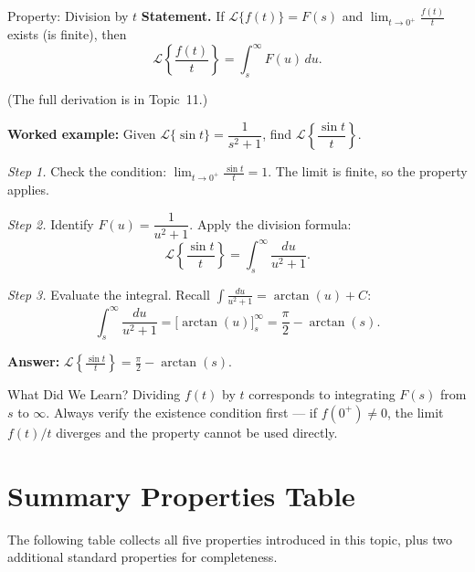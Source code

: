 \documentclass[12pt,a4paper]{article}
\begin{document}
\begin{infobox}{Property: Division by $t$}
\textbf{Statement.} If $\mathcal{L}\{f(t)\} = F(s)$ and
$\displaystyle\lim_{t\to 0^+}\frac{f(t)}{t}$ exists (is finite), then
\[
  \mathcal{L}\!\left\{\frac{f(t)}{t}\right\} = \int_s^{\infty} F(u)\,du.
\]

(The full derivation is in Topic~11.)

\bigskip
\textbf{Worked example: } Given $\mathcal{L}\{\sin t\} = \dfrac{1}{s^2+1}$, find
$\mathcal{L}\!\left\{\dfrac{\sin t}{t}\right\}$.

\emph{Step 1.} Check the condition: $\displaystyle\lim_{t\to 0^+}\frac{\sin t}{t} = 1$.
The limit is finite, so the property applies.

\emph{Step 2.} Identify $F(u) = \dfrac{1}{u^2+1}$. Apply the division formula:
\[
  \mathcal{L}\!\left\{\frac{\sin t}{t}\right\}
  = \int_s^{\infty} \frac{du}{u^2+1}.
\]

\emph{Step 3.} Evaluate the integral. Recall
$\displaystyle\int \frac{du}{u^2+1} = \arctan(u) + C$:
\[
  \int_s^{\infty} \frac{du}{u^2+1}
  = \Big[\arctan(u)\Big]_s^{\infty}
  = \frac{\pi}{2} - \arctan(s).
\]

\textbf{Answer:} $\displaystyle\mathcal{L}\!\left\{\frac{\sin t}{t}\right\} = \frac{\pi}{2} - \arctan(s)$.
\end{infobox}

\begin{learnbox}{What Did We Learn?}
Dividing $f(t)$ by $t$ corresponds to integrating $F(s)$ from $s$ to $\infty$. Always verify
the existence condition first --- if $f(0^+) \neq 0$, the limit $f(t)/t$ diverges and the
property cannot be used directly.
\end{learnbox}

\section{Summary Properties Table}

The following table collects all five properties introduced in this topic, plus two additional
standard properties for completeness.
\end{document}
